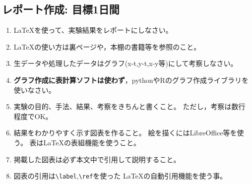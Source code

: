 \documentclass{jsarticle}
\begin{document}
\subsection{レポート作成: 目標1日間}
\begin{enumerate}
\item \LaTeX を使って、実験結果をレポートにしなさい。
\item \LaTeX の使い方は裏ページや，本棚の書籍等を参照のこと。
\item 生データや処理したデータはグラフ(x-t,y-t,x-y等)にして考察しなさい。
\item \textbf{グラフ作成に表計算ソフトは使わず}，pythonやRのグラフ作成ライブラリを使いなさい。
\item 実験の目的、手法、結果、考察をきちんと書くこと。
  ただし，考察は数行程度でOK。
\item 結果をわかりやすく示す図表を作ること。
  絵を描くにはLibreOffice等を使う。
  表は\LaTeX の表組機能を使うこと。
\item 掲載した図表は必ず本文中で引用して説明すること。
\item 図表の引用は\verb|\label|,\verb|\ref|を使った
  \LaTeX の自動引用機能を使う事。
\end{enumerate}
\end{document}
